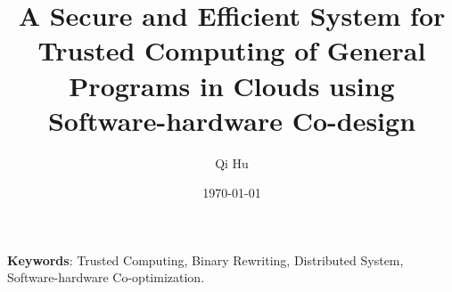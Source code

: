\documentclass[a4paper,11pt]{article}
\title{A Secure and Efficient System for Trusted Computing of General Programs in Clouds using Software-hardware Co-design}
\author{Qi Hu}
\date{\today}
\newcommand\keywords[1]{\textbf{Keywords}: #1}
\begin{document}
  \maketitle%
  \keywords{Trusted Computing, Binary Rewriting, Distributed System, Software-hardware Co-optimization.}

  
  
  
  
  
  

  
  
\end{document}
